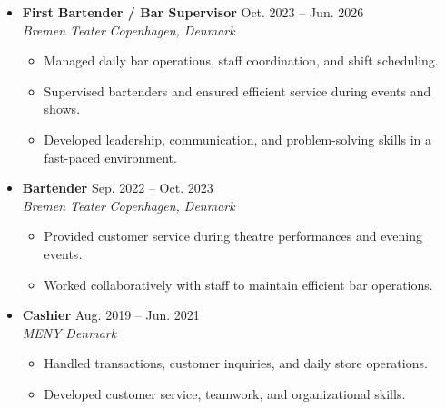 \documentclass[letterpaper,10pt]{article}
\begin{document}
\begin{itemize}

    \item[]
    \textbf{First Bartender / Bar Supervisor}
    \hfill Oct. 2023 -- Jun. 2026\\
    \textit{Bremen Teater}
    \hfill \textit{Copenhagen, Denmark}

    \begin{itemize}
        \item Managed daily bar operations,
        staff coordination, and shift scheduling.
        \item Supervised bartenders and ensured
        efficient service during events and shows.
        \item Developed leadership, communication,
        and problem-solving skills in a
        fast-paced environment.
    \end{itemize}

    \vspace{4pt}

    \item[]
    \textbf{Bartender}
    \hfill Sep. 2022 -- Oct. 2023\\
    \textit{Bremen Teater}
    \hfill \textit{Copenhagen, Denmark}

    \begin{itemize}
        \item Provided customer service during
        theatre performances and evening events.
        \item Worked collaboratively with staff
        to maintain efficient bar operations.
    \end{itemize}

    \vspace{4pt}

    \item[]
    \textbf{Cashier}
    \hfill Aug. 2019 -- Jun. 2021\\
    \textit{MENY}
    \hfill \textit{Denmark}

    \begin{itemize}
        \item Handled transactions, customer
        inquiries, and daily store operations.
        \item Developed customer service,
        teamwork, and organizational skills.
    \end{itemize}

\end{itemize}
\end{document}
